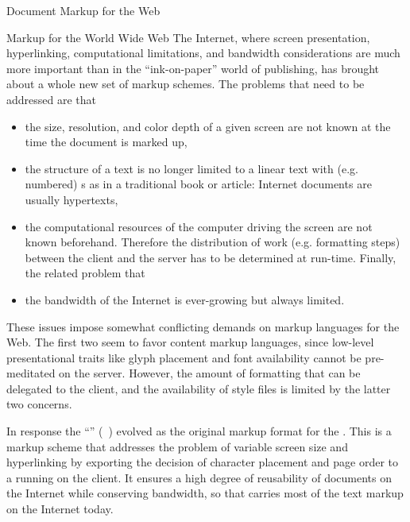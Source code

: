 \begin{omgroup}[id=markup-web]{Document Markup for the Web}
\begin{omgroup}[id=markup:www]{Markup for the World Wide Web}
The Internet, where screen presentation, hyperlinking, computational limitations,
and bandwidth considerations are much more important than in the ``ink-on-paper''
world of publishing, has brought about a whole new set of markup schemes. The
problems that need to be addressed are that
\begin{itemize}
\item the size, resolution, and color depth of a given screen are not known at the time
  the document is marked up,
\item the structure of a text is no longer limited to a linear text with (e.g.  numbered)
  {s} as in a traditional book or article: Internet documents
  are usually hypertexts,
\item the computational resources of the computer driving the screen are not known
  beforehand. Therefore the distribution of work (e.g. formatting steps) between the
  client and the server has to be determined at run-time. Finally, the related problem that
\item the bandwidth of the Internet is ever-growing but always limited.
\end{itemize}

These issues impose somewhat conflicting demands on markup languages for the Web.  The
first two seem to favor content markup languages, since low-level presentational traits
like glyph placement and font availability cannot be pre-meditated on the server. However,
the amount of formatting that can be delegated to the client, and the availability of
style files is limited by the latter two concerns.

In response the ``{}'' ({\html}~\cite{RagHor:html98})
evolved as the original markup format for the {}. This is a
markup scheme that addresses the problem of variable screen size and hyperlinking by
exporting the decision of character placement and page order to a {}
running on the client.  It ensures a high degree of reusability of documents on the
Internet while conserving bandwidth, so that {\html} carries most of the text markup on
the Internet today.


\end{omgroup}
\end{omgroup}
